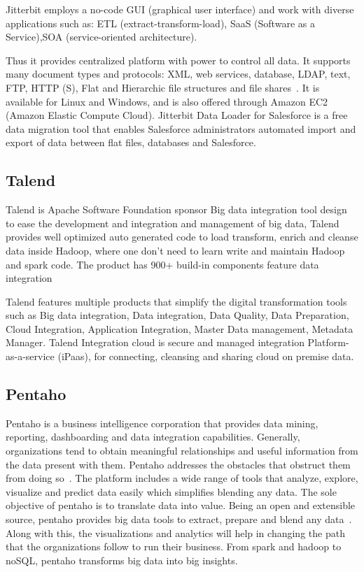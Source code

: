     Jitterbit employs a no-code GUI (graphical user interface) and
    work with diverse applications such as: ETL
    (extract-transform-load), SaaS (Software as a Service),SOA
    (service-oriented architecture).

    Thus it provides centralized platform with power to control all
    data. It supports many document types and protocols: XML, web
    services, database, LDAP, text, FTP, HTTP (S), Flat and Hierarchic
    file structures and file shares~\cite{tech-manual}. It is
    available for Linux and Windows, and is also offered through
    Amazon EC2 (Amazon Elastic Compute Cloud). Jitterbit Data Loader
    for Salesforce is a free data migration tool that enables
    Salesforce administrators automated import and export of data
    between flat files, databases and Salesforce.

    \pv

\subsection{Talend}

    Talend is Apache Software Foundation sponsor Big data integration
    tool design to ease the development and integration and management
    of big data, Talend provides well optimized auto generated code to
    load transform, enrich and cleanse data inside Hadoop, where one
    don't need to learn write and maintain Hadoop and spark code.  The
    product has 900+ build-in components feature data integration
     
    Talend features multiple products that simplify the digital
    transformation tools such as Big data integration, Data
    integration, Data Quality, Data Preparation, Cloud Integration,
    Application Integration, Master Data management, Metadata Manager.
    Talend Integration cloud is secure and managed integration
    Platform-as-a-service (iPaas), for connecting, cleansing and
    sharing cloud on premise data.

    \pv

\subsection{Pentaho}

Pentaho is a business intelligence corporation that provides data
mining, reporting, dashboarding and data integration
capabilities. Generally, organizations tend to obtain meaningful
relationships and useful information from the data present with
them. Pentaho addresses the obstacles that obstruct them from doing
so~\cite{pent1}. The platform includes a wide range of tools that
analyze, explore, visualize and predict data easily which simplifies
blending any data. The sole objective of pentaho is to translate data
into value. Being an open and extensible source, pentaho provides big
data tools to extract, prepare and blend any data~\cite{pent2}. Along
with this, the visualizations and analytics will help in changing the
path that the organizations follow to run their business. From spark
and hadoop to noSQL, pentaho transforms big data into big insights.

